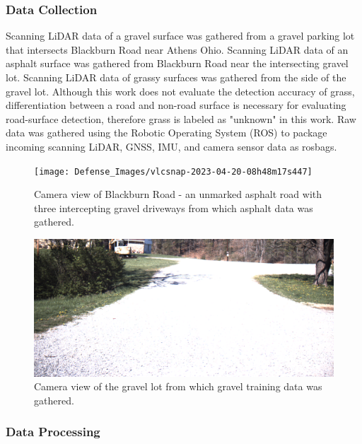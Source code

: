 \documentclass[numbered,pdftex]{ohio-etd}
\begin{document}
{{{{			} %
			
			\subsubsection{Data Collection}{
				
				{Scanning LiDAR data of a gravel surface was gathered from a gravel parking lot that intersects Blackburn Road near Athens Ohio. Scanning LiDAR data of an asphalt surface was gathered from Blackburn Road near the intersecting gravel lot. Scanning LiDAR data of grassy surfaces was gathered from the side of the gravel lot. Although this work does not evaluate the detection accuracy of grass, differentiation between a road and non-road surface is necessary for evaluating road-surface detection, therefore grass is labeled as "unknown" in this work. Raw data was gathered using the Robotic Operating System (ROS) to package incoming scanning LiDAR, GNSS, IMU, and camera sensor data as rosbags.}
				
				
				\begin{figure}[H]
					\centering
					\texttt{[image: Defense\_Images/vlcsnap-2023-04-20-08h48m17s447]}
					\caption[Blackburn Road Camera View]{Camera view of Blackburn Road - an unmarked asphalt road with three intercepting gravel driveways from which asphalt data was gathered.}
					\label{fig:Blackburn_Road_View}
				\end{figure}
				
				\begin{figure}[H]
					\centering
					\includegraphics[width=0.75\linewidth]{Defense_Images/gravel_training_lot}
					\caption[Gravel Training Lot]{Camera view of the gravel lot from which gravel training data was gathered.}
					\label{fig:gravel_training_lot}
				\end{figure}
										
			} %
				
			\subsubsection{Data Processing}\label{sec:data_processing}{

}}}}
\end{document}
